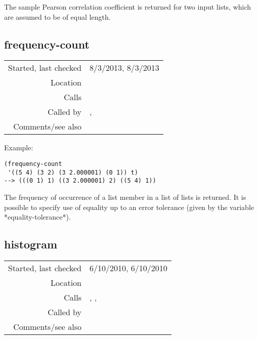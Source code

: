 \noindent The sample Pearson correlation coefficient
is returned for two input lists, which are assumed to
be of equal length.


\subsection*{frequency-count}\label{fun:frequency-count}

\vspace{0.3cm}
\begin{tabular}{r|p{8cm}}
Started, last checked & 8/3/2013, 8/3/2013 \\
Location & \nameref{sec:stats-sampling} \\
Calls & \nameref{fun:sort-dataset-asc} \\
Called by & \nameref{fun:most-frequent-difference-vector},\newline \nameref{fun:structure-induction-algorithm-r} \\
Comments/see also & 
\end{tabular}

\vspace{0.5cm}
\noindent Example:
\begin{verbatim}
(frequency-count
 '((5 4) (3 2) (3 2.000001) (0 1)) t)
--> (((0 1) 1) ((3 2.000001) 2) ((5 4) 1))
\end{verbatim}

\noindent The frequency of occurrence of a list member
in a list of lists is returned. It is possible to
specify use of equality up to an error tolerance
(given by the variable *equality-tolerance*).




\subsection*{histogram}\label{fun:histogram}

\vspace{0.3cm}
\begin{tabular}{r|p{8cm}}
Started, last checked & 6/10/2010, 6/10/2010 \\
Location & \nameref{sec:stats-sampling} \\
Calls & \nameref{fun:add-to-nth}, \nameref{fun:constant-vector},\newline \nameref{fun:index-1st-sublist-item>=} \\
Called by & \nameref{fun:matching-score-histogram} \\
Comments/see also & 
\end{tabular}

